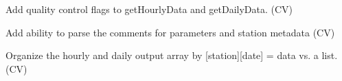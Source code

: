 
\begin{DoxyRefList}
\item[\label{todo__todo000001}%
\hypertarget{todo__todo000001}{}%
\-Class \hyperlink{class_c_r_o_n_o_s}{\-C\-R\-O\-N\-O\-S} ]\-Add quality control flags to get\-Hourly\-Data and get\-Daily\-Data. (\-C\-V) 

\-Add ability to parse the comments for parameters and station metadata (\-C\-V) 

\-Organize the hourly and daily output array by \mbox{[}station\mbox{]}\mbox{[}date\mbox{]} = data vs. a list. (\-C\-V) 
\end{DoxyRefList}